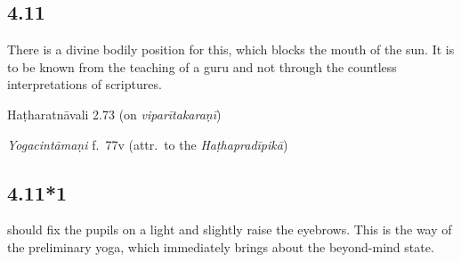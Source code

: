 \begin{ekdosis}
\subsection*{4.11}
\begin{translation}[hp04_011]
There is a divine bodily position for this, which blocks the mouth of the sun. It is to be known from the teaching of a guru and not through the countless interpretations of scriptures.
\end{translation}


\begin{testimonia}[hp04_011]
Haṭharatnāvali 2.73 (on \emph{viparītakaraṇī})
\begin{versinnote}
\end{versinnote}

\emph{Yogacintāmaṇi} f.~77v (attr.~to the \emph{Haṭhapradīpikā})
\begin{versinnote}
\end{versinnote}

\end{testimonia}

\begin{philcomm}[hp04_011]
\end{philcomm}

\subsection*{4.11*1}
\begin{translation} should fix the pupils on a light and slightly raise the eyebrows. This is the way of the preliminary yoga, which immediately brings about the beyond-mind state.
\end{translation}


\end{ekdosis}
